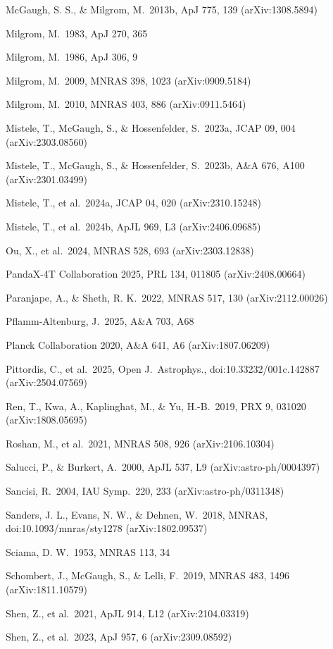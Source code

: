 \documentclass[
  10pt,
]{article}
\begin{document}
{\begin{list}{}{\setlength{\leftmargin}{1.5em}\setlength{\itemindent}{-1.5em}\setlength{\itemsep}{1pt}\setlength{\parsep}{0pt}}
\item McGaugh, S. S., \& Milgrom, M.\ 2013b, ApJ 775, 139 (arXiv:1308.5894)
\item Milgrom, M.\ 1983, ApJ 270, 365
\item Milgrom, M.\ 1986, ApJ 306, 9
\item Milgrom, M.\ 2009, MNRAS 398, 1023 (arXiv:0909.5184)
\item Milgrom, M.\ 2010, MNRAS 403, 886 (arXiv:0911.5464)
\item Mistele, T., McGaugh, S., \& Hossenfelder, S.\ 2023a, JCAP 09, 004 (arXiv:2303.08560)
\item Mistele, T., McGaugh, S., \& Hossenfelder, S.\ 2023b, A\&A 676, A100 (arXiv:2301.03499)
\item Mistele, T., et al.\ 2024a, JCAP 04, 020 (arXiv:2310.15248)
\item Mistele, T., et al.\ 2024b, ApJL 969, L3 (arXiv:2406.09685)
\item Ou, X., et al.\ 2024, MNRAS 528, 693 (arXiv:2303.12838)
\item PandaX-4T Collaboration 2025, PRL 134, 011805 (arXiv:2408.00664)
\item Paranjape, A., \& Sheth, R. K.\ 2022, MNRAS 517, 130 (arXiv:2112.00026)
\item Pflamm-Altenburg, J.\ 2025, A\&A 703, A68
\item Planck Collaboration 2020, A\&A 641, A6 (arXiv:1807.06209)
\item Pittordis, C., et al.\ 2025, Open J.\ Astrophys., doi:10.33232/001c.142887 (arXiv:2504.07569)
\item Ren, T., Kwa, A., Kaplinghat, M., \& Yu, H.-B.\ 2019, PRX 9, 031020 (arXiv:1808.05695)
\item Roshan, M., et al.\ 2021, MNRAS 508, 926 (arXiv:2106.10304)
\item Salucci, P., \& Burkert, A.\ 2000, ApJL 537, L9 (arXiv:astro-ph/0004397)
\item Sancisi, R.\ 2004, IAU Symp.\ 220, 233 (arXiv:astro-ph/0311348)
\item Sanders, J. L., Evans, N. W., \& Dehnen, W.\ 2018, MNRAS, doi:10.1093/mnras/sty1278 (arXiv:1802.09537)
\item Sciama, D. W.\ 1953, MNRAS 113, 34
\item Schombert, J., McGaugh, S., \& Lelli, F.\ 2019, MNRAS 483, 1496 (arXiv:1811.10579)
\item Shen, Z., et al.\ 2021, ApJL 914, L12 (arXiv:2104.03319)
\item Shen, Z., et al.\ 2023, ApJ 957, 6 (arXiv:2309.08592)

\end{list}}
\end{document}
